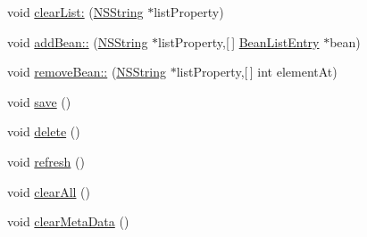 \begin{DoxyCompactItemize}
\item 
void \hyperlink{interface_mobile_bean_a9431c353027aa9660a8f8eeb894cc1e8}{clear\-List\-:} (\hyperlink{class_n_s_string}{\-N\-S\-String} $\ast$list\-Property)
\item 
void \hyperlink{interface_mobile_bean_a08c5cfccb1ef6baa7a1884fe711e359f}{add\-Bean\-::} (\hyperlink{class_n_s_string}{\-N\-S\-String} $\ast$list\-Property,\mbox{[}$\,$\mbox{]} \hyperlink{interface_bean_list_entry}{\-Bean\-List\-Entry} $\ast$bean)
\item 
void \hyperlink{interface_mobile_bean_a6b6e69fbbc584d74a4b41c8f943405ee}{remove\-Bean\-::} (\hyperlink{class_n_s_string}{\-N\-S\-String} $\ast$list\-Property,\mbox{[}$\,$\mbox{]} int element\-At)
\item 
void \hyperlink{interface_mobile_bean_a45d21ce70f94a528516ab2a2d260c45e}{save} ()
\item 
void \hyperlink{interface_mobile_bean_a5ab770172226f0ac753ab6a77e86dacd}{delete} ()
\item 
void \hyperlink{interface_mobile_bean_aee22e60620f8758015733b09bdbd2ef6}{refresh} ()
\item 
void \hyperlink{interface_mobile_bean_a61c19b6207e6bff785cd64f28fa54204}{clear\-All} ()
\item 
void \hyperlink{interface_mobile_bean_a79f8ab8f6fc21f3724c2460b9298bb93}{clear\-Meta\-Data} ()
\end{DoxyCompactItemize}
